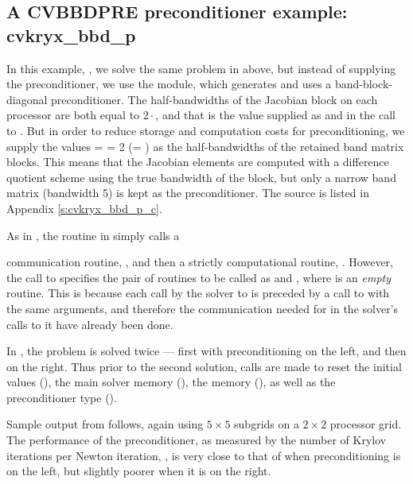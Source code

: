 

\subsection{A CVBBDPRE preconditioner example: cvkryx\_bbd\_p}\label{ss:cvkryx_bbd_p}

In this example, , we solve the same problem in 
above, but instead of supplying the preconditioner, we use the {\cvbbdpre} module,
which generates and uses a band-block-diagonal preconditioner.  The
half-bandwidths of the Jacobian block on each processor are both equal to
$2\cdot$, and that is the value supplied as  and 
in the call to .  But in order to reduce storage and computation
costs for preconditioning, we supply the values  =  = 2
(= ) as the half-bandwidths of the retained band matrix blocks.
This means that the Jacobian elements are computed with a difference quotient
scheme using the true bandwidth of the block, but only a narrow band matrix
(bandwidth 5) is kept as the preconditioner.  The source is listed in
Appendix \ref{s:cvkryx_bbd_p_c}. 

As in , the  routine in  simply calls a

communication routine, , and then a strictly computational routine,
.  However, the call to  specifies the pair of
routines to be called as  and , where  is an
{\em empty} routine.  This is because each call by the solver to  is
preceded by a call to  with the same  arguments, and therefore the
communication needed for  in the solver's calls to it have already been
done.

In , the problem is solved twice --- first with preconditioning
on the left, and then on the right.  Thus prior to the second solution, calls
are made to reset the initial values (), the main solver
memory (), the {\cvbbdpre} memory (),
as well as the preconditioner type ().

Sample output from  follows, again using $5 \times 5$ subgrids 
on a $2 \times 2$ processor grid.  The performance of the preconditioner,
as measured by the number of Krylov iterations per Newton iteration,
, is very close to that of  when preconditioning is on
the left, but slightly poorer when it is on the right.


